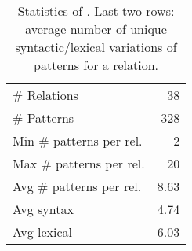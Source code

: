 \begin{table}[t]
    \centering
\begin{tabular}{lr}
  \toprule
    \# Relations &   38 \\
    \# Patterns & 328 \\
    \midrule
 Min \# patterns per rel. &    2 \\
 Max \# patterns per rel. &   20 \\
 Avg \# patterns per rel. &    8.63 \\
 \midrule
   Avg syntax  &    4.74 \\
  Avg lexical  &    6.03 \\
\bottomrule
\end{tabular}
    \caption{Statistics of \resource{}. 
    Last two rows: average number of unique
    syntactic/lexical variations of patterns for a relation.}
    \label{tab:rel-graph-stats}
    
    \vspace{-0.1in}
\end{table}

